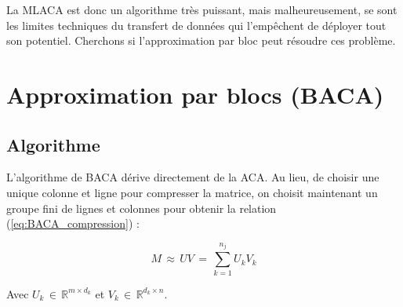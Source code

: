 \documentclass[10pt]{SelfArx} %
\begin{document}
La MLACA est donc un algorithme très puissant, mais malheureusement, se sont les limites techniques du transfert de données qui l'empêchent de déployer tout son potentiel. Cherchons si l'approximation par bloc peut résoudre ces problème. 


\section{Approximation par blocs (BACA)}
\subsection{Algorithme}
L'algorithme de BACA dérive directement de la ACA. Au lieu, de choisir une unique colonne et ligne pour compresser la matrice, on choisit maintenant un groupe fini de lignes et colonnes pour obtenir la relation (\ref{eq:BACA_compression}) \cite{liu_parallel_2020} :

\begin{equation}
    M \, \approx \, UV \, = \, \sum_{k=1}^{n_j} U_kV_k 
    \label{eq:BACA_compression}
\end{equation}

Avec $U_k \, \in \, \mathbb{R}^{m \times d_k}$ et $V_k \, \in \, \mathbb{R}^{d_k \times n}$. 
\end{document}
